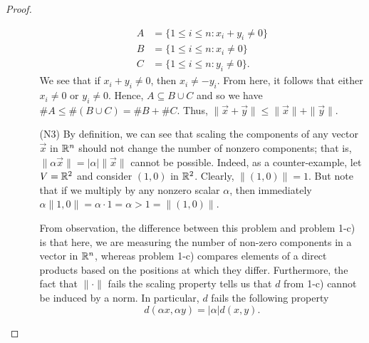 \documentclass[a4paper]{article}
\begin{document}
\begin{proof}
\begin{enumerate}
\begin{enumerate}
                \begin{align*}
                    A &= \{ 1 \leq i \leq n : {x}_{i} + {y}_{i} \neq 0  \}  \\
                    B &= \{ 1 \leq i \leq n : {x}_{i} \neq 0  \}  \\
                    C &= \{ 1 \leq i \leq n : {y}_{i} \neq 0  \}.
                \end{align*}
                We see that if \( {x}_{i} + {y}_{i} \neq 0  \), then \( {x}_{i} \neq - {y}_{i}  \). From here, it follows that either \( {x}_{i} \neq 0  \) or \( {y}_{i} \neq 0  \). Hence, \( A \subseteq  B \cup C  \) and so we have \( \# A \leq \#(B \cup C) = \# B + \#C  \).  Thus, \( \|\vec{ x }  + \vec{ y } \| \leq \|\vec{ x  }\| + \|\vec{ y }\| \).
            \item[(N3)] By definition, we can see that scaling the components of any vector \( \vec{ x }  \) in \( \mathbb{R}^{n} \) should not change the number of nonzero components; that is, \( \|\alpha \vec{ x } \| =   | \alpha | \|\vec{ x } \|   \) cannot be possible. Indeed, as a counter-example, let \( V = \mathbb{R}^{2} \) and consider \( (1,0)  \) in \( \mathbb{R}^{2} \). Clearly, \( \|(1,0)\| = 1 \). But note that if we multiply by any nonzero scalar \( \alpha  \), then immediately \( \alpha \|1,0\| = \alpha \cdot 1 = \alpha > 1 = \|(1,0)\| \). 

From observation, the difference between this problem and problem 1-c) is that here, we are measuring the number of non-zero components in a vector in \( \mathbb{R}^{n} \), whereas problem 1-c) compares elements of a direct products based on the positions at which they differ. Furthermore, the fact that \( \|\cdot\| \) fails the scaling property tells us that \( d  \) from 1-c) cannot be induced by a norm. In particular, \( d  \) fails the following property
\[  d(\alpha x, \alpha y) = | \alpha | d(x,y).  \]
        \end{enumerate}
\end{enumerate}
\end{proof}
\end{document}
